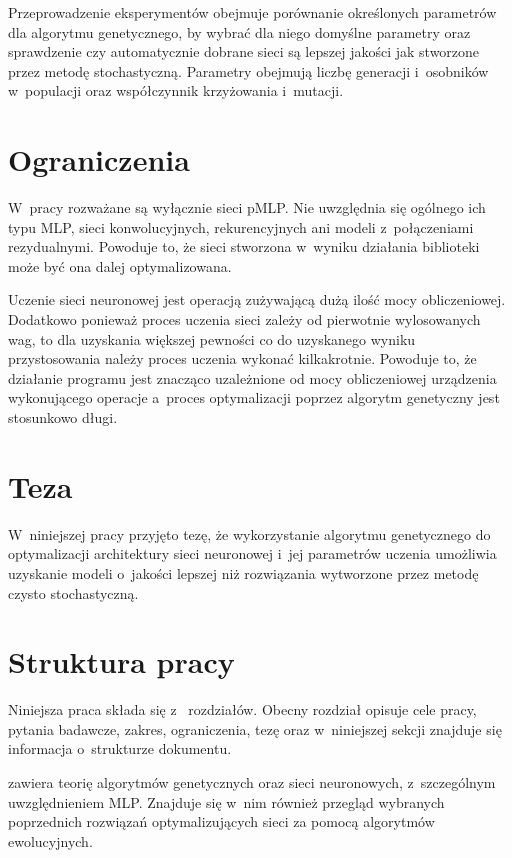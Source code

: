 Przeprowadzenie eksperymentów obejmuje porównanie
określonych parametrów dla algorytmu genetycznego,
by wybrać dla niego domyślne parametry oraz sprawdzenie
czy automatycznie dobrane sieci są lepszej jakości
jak stworzone przez metodę stochastyczną.
Parametry obejmują liczbę generacji i~osobników
w~populacji oraz współczynnik krzyżowania i~mutacji.

\section*{Ograniczenia}
W~pracy rozważane są wyłącznie
sieci \acrshort{pMLP}.
Nie uwzględnia się ogólnego ich typu \acrshort{MLP},
sieci konwolucyjnych, rekurencyjnych
ani modeli z~połączeniami rezydualnymi.
Powoduje to, że sieci stworzona
w~wyniku działania biblioteki
może być ona dalej optymalizowana.

Uczenie sieci neuronowej jest operacją zużywającą
dużą ilość mocy obliczeniowej.
Dodatkowo ponieważ proces uczenia sieci zależy
od pierwotnie wylosowanych wag,
to dla uzyskania większej pewności
co do uzyskanego wyniku przystosowania należy
proces uczenia wykonać kilkakrotnie.
Powoduje to, że działanie programu
jest znacząco uzależnione
od mocy obliczeniowej urządzenia
wykonującego operacje
a~proces optymalizacji
poprzez algorytm genetyczny
jest stosunkowo długi.

\section*{Teza}
W~niniejszej pracy przyjęto tezę,
że wykorzystanie algorytmu genetycznego
do optymalizacji architektury sieci neuronowej
i~jej parametrów uczenia umożliwia uzyskanie modeli
o~jakości lepszej niż rozwiązania wytworzone
przez metodę czysto stochastyczną.

\section*{Struktura pracy}
Niniejsza praca składa się
z~ rozdziałów.
Obecny rozdział opisuje cele pracy,
pytania badawcze, zakres, ograniczenia,
tezę oraz w~niniejszej sekcji
znajduje się informacja o~strukturze dokumentu.

 zawiera teorię
algorytmów genetycznych oraz sieci neuronowych,
z~szczególnym uwzględnieniem \acrshort{MLP}.
Znajduje się w~nim również przegląd wybranych
poprzednich rozwiązań optymalizujących sieci
za pomocą algorytmów ewolucyjnych.

